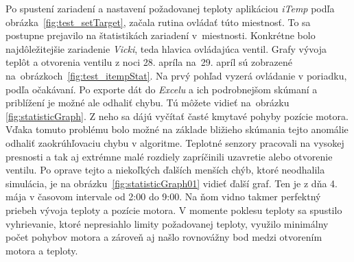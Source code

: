 Po spustení zariadení a nastavení požadovanej teploty aplikáciou \emph{iTemp} podľa obrázka~\ref{fig:test_setTarget}, začala rutina ovládať túto miestnosť. 
To sa postupne prejavilo na štatistikách zariadení v~miestnosti. 
Konkrétne bolo najdôležitejšie zariadenie \emph{Vicki}, teda hlavica ovládajúca ventil. 
Grafy vývoja teplôt a otvorenia ventilu z noci 28. apríla na~29. apríl sú zobrazené na~obrázkoch~\ref{fig:test_itempStat}. 
Na prvý pohľad vyzerá ovládanie v poriadku, podľa očakávaní. 
Po exporte dát do \emph{Excelu} a ich podrobnejšom skúmaní a priblížení je možné ale odhaliť chybu. 
Tú môžete vidieť na~obrázku \ref{fig:statisticGraph}.
Z neho sa dájú vyčítať časté kmytavé pohyby pozície motora.
Vďaka tomuto problému bolo možné na základe bližieho skúmania tejto anomálie odhaliť zaokrúhľovaciu chybu v algoritme. 
Teplotné senzory pracovali na vysokej presnosti a tak aj extrémne malé rozdiely zapríčinili uzavretie alebo otvorenie ventilu. 
Po oprave tejto a niekoľkých ďalších menších chýb, ktoré neodhalila simulácia, je na obrázku~\ref{fig:statisticGraph01} vidieť ďalší graf. 
Ten je z dňa 4. mája v časovom intervale od 2:00 do 9:00. 
Na ňom vidno takmer perfektný priebeh vývoja teploty a pozície motora.
V momente poklesu teploty sa spustilo vyhrievanie, ktoré nepresiahlo limity požadovanej teploty, využilo minimálny počet pohybov motora a zároveň aj našlo rovnovážny bod medzi otvorením motora a teploty.

